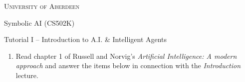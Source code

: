 \documentclass[11pt]{article}
\newcommand{\question}[1]{#1}
\newcommand{\answer}[1]{}
\begin{document}
\centerline{\textsc{University of Aberdeen}} 
\centerline{Symbolic AI (CS502K)}
\centerline{Tutorial I  -- Introduction to A.I. \& Intelligent Agents} 

\hrulefill


\begin{enumerate}
\item Read chapter 1 of Russell and Norvig's \emph{Artificial Intelligence: A modern approach} and answer the items below in connection with the \emph{Introduction} lecture.
\begin{enumerate}


\end{enumerate}
\end{enumerate}
\end{document}

